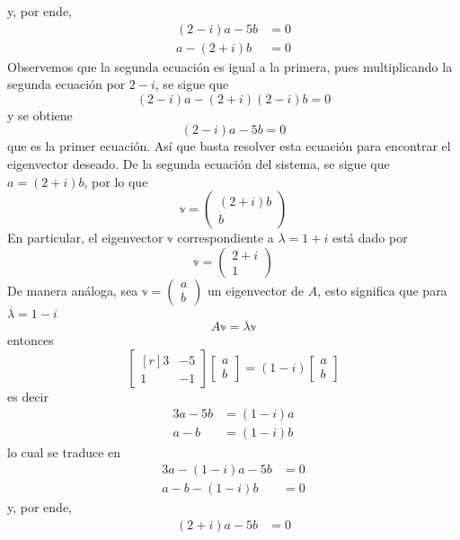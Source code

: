\begin{example}
    y, por ende,
    \begin{align*}
        (2 - i)a - 5b & = 0 \\
        a - (2 + i)b & = 0
    \end{align*}
    Observemos que la segunda ecuación es igual a la primera, pues multiplicando la segunda ecuación por $2 - i$, se sigue que
    $$(2 - i)a - (2 + i)(2 - i)b = 0$$
    y se obtiene
    $$(2 - i)a - 5b = 0$$
    que es la primer ecuación. Así que basta resolver esta ecuación para encontrar el eigenvector deseado. De la segunda ecuación del sistema, se sigue que $a = (2 + i)b$, por lo que
    $$\mathbb{v} = \begin{pmatrix}
        (2 + i)b \\
        b
    \end{pmatrix}$$
    En particular, el eigenvector $\mathbb{v}$ correspondiente a $\lambda = 1 + i$ está dado por
    $$\mathbb{v} = \begin{pmatrix}
        2 + i \\
        1
    \end{pmatrix}$$
    De manera análoga, sea $\mathbb{v} = \begin{pmatrix} a \\ b \end{pmatrix}$ un eigenvector de $A$, esto significa que para $\overline{\lambda} = 1 - i$
    $$A \mathbb{v} = \overline{\lambda} \mathbb{v}$$
    entonces
    $$\begin{bmatrix*}[r]
        3 & -5 \\
        1 & -1
    \end{bmatrix*} \begin{bmatrix}
        a \\
        b
    \end{bmatrix} = (1 - i) \begin{bmatrix}
        a \\
        b
    \end{bmatrix}$$
    es decir
    \begin{align*}
        3a - 5b & = (1 - i)a \\
        a - b & = (1 - i)b
    \end{align*}
    lo cual se traduce en
    \begin{align*}
        3a - (1 - i)a - 5b & = 0 \\
        a - b - (1 - i)b & = 0
    \end{align*}
    y, por ende,
    \begin{align*}
        (2 + i)a - 5b & = 0 \\

\end{align*}
\end{example}
